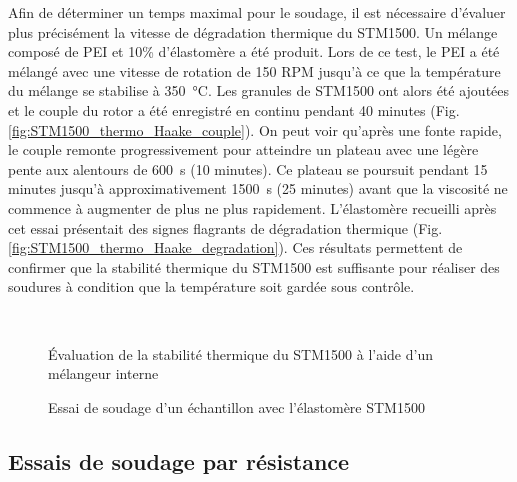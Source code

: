 Afin de déterminer un temps maximal pour le soudage, il est nécessaire d'évaluer plus précisément la vitesse de dégradation thermique du STM1500. 
Un mélange composé de PEI et 10\% d'élastomère a été produit. 
Lors de ce test, le PEI a été mélangé avec une vitesse de rotation de 150 RPM jusqu'à ce que la température du mélange se stabilise à \SI{350}{\celsius}. 
Les granules de STM1500 ont alors été ajoutées et le couple du rotor a été enregistré en continu pendant 40 minutes (Fig. \ref{fig:STM1500_thermo_Haake_couple}). 
On peut voir qu'après une fonte rapide, le couple remonte progressivement pour atteindre un plateau avec une légère pente aux alentours de \SI{600}{\second} (10 minutes). 
Ce plateau se poursuit pendant 15 minutes jusqu'à approximativement \SI{1500}{\second} (25 minutes) avant que la viscosité ne commence à augmenter de plus ne plus rapidement. 
L'élastomère recueilli après cet essai présentait des signes flagrants de dégradation thermique (Fig. \ref{fig:STM1500_thermo_Haake_degradation}). 
Ces résultats permettent de confirmer que la stabilité thermique du STM1500 est suffisante pour réaliser des soudures à condition que la température soit gardée sous contrôle. 

\begin{figure}[h]	
	\centering
	 \qquad
	 \\
	\caption{Évaluation de la stabilité thermique du STM1500 à l'aide d'un mélangeur interne}
	\label{fig:STM1500_thermo_Haake}
\end{figure}

\FloatBarrier

\begin{figure}[h]
	\centering
	 \qquad
	\caption{Essai de soudage d'un échantillon avec l'élastomère STM1500}
	\label{fig:STM1500_soudure}
\end{figure}

\subsection{Essais de soudage par résistance}

